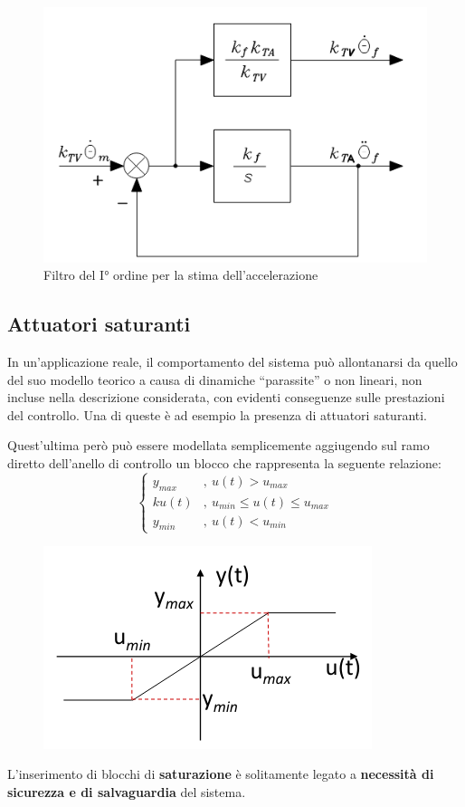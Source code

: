 \begin{figure}[H]
	\centering
	\includegraphics[width=0.4\linewidth]{images/acceleration_estimate}
	\caption{Filtro del I° ordine per la stima dell'accelerazione}
	\label{fig:accelerationestimate}
\end{figure}







\subsection{Attuatori saturanti}
In un’applicazione reale, il comportamento del sistema può allontanarsi da quello del suo modello teorico a causa di dinamiche “parassite” o non lineari, non incluse nella descrizione considerata, con evidenti conseguenze sulle prestazioni del controllo. Una di queste è ad esempio la presenza di attuatori saturanti.

Quest'ultima però può essere modellata semplicemente aggiugendo sul ramo diretto dell’anello di controllo un blocco che rappresenta la seguente relazione:
$$
\begin{cases}
	y_{max} & , \ u(t) > u_{max} \\
	ku(t) & , \ u_{min} \leq u(t) \leq u_{max} \\
	y_{min} & , \ u(t) < u_{min}
\end{cases}
$$


\begin{figure}[H]
	\centering
	\includegraphics[width=0.4\linewidth]{images/saturation}
	\label{fig:saturation}
\end{figure}


L’inserimento di blocchi di \textbf{saturazione} è solitamente legato a \textbf{necessità di sicurezza e di salvaguardia} del sistema.

